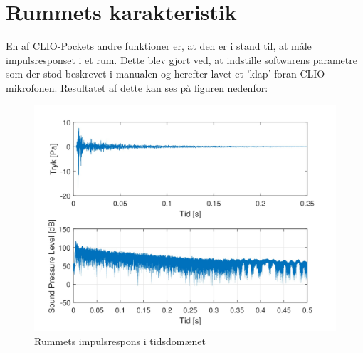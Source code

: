 \newpage
\section{Rummets karakteristik}
En af CLIO-Pockets andre funktioner er, at den er i stand til, at måle impulsresponset i et rum. Dette blev gjort ved, at indstille softwarens parametre som der stod beskrevet i manualen og herefter lavet et 'klap' foran CLIO-mikrofonen. Resultatet af dette kan ses på figuren nedenfor:
\begin{figure}[H]
	\centering
	\vspace{-12pt}
	\includegraphics[width=\textwidth]{Billeder/Grafer/ImpulsResponse}
	\caption{Rummets impulsrespons i tidsdomænet}
\end{figure}